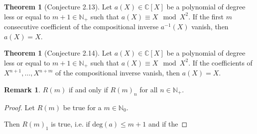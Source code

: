 \documentclass[a4paper]{article}
\theoremstyle{definition}
\newtheorem{theorem}[definition]{Theorem}
\newtheorem*{remark}{Remark}
\begin{document}
\begin{theorem}[Conjecture 2.13]
    Let \(a(X) \in \mathbb{C}[X]\) be a polynomial of degree less or equal to \(m + 1 \in \mathbb{N}_+\) such that \(a(X) \equiv X \mod{X^2}\). If the first \(m\) consecutive coefficient of the compositional inverse \(a^{-1}(X)\) vanish, then \(a(X) = X\).
\end{theorem}

\begin{theorem}[Conjecture 2.14]
    Let \(a(X) \in \mathbb{C}[X]\) be a polynomial of degree less or equal to \(m + 1 \in \mathbb{N}_+\) such that \(a(X) \equiv X \mod{X^2}\). If the coefficients of \(X^{n+1}, \ldots, X^{n+m}\) of the compositional inverse vanish, then \(a(X) = X\).
\end{theorem}

\begin{remark}
    \(R(m)\) if and only if \(R(m)_n\) for all \(n \in \mathbb{N}_+\).
\end{remark}

\begin{proof}
    Let \(R(m)\) be true for a \(m \in \mathbb{N}_0\).

    Then \(R(m)_1\) is true, i.e. if \(\text{deg}(a) \leq m + 1\) and if the
\end{proof}
\end{document}
